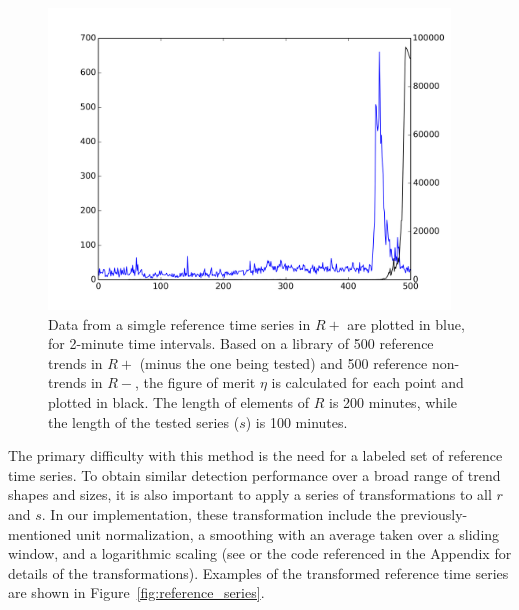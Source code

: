 \documentclass{article}
\begin{document}
\begin{figure}
\begin{center}
\includegraphics[width=0.95\textwidth]{fig/nikolov.png} 
\caption{Data from a simgle reference time series in $R+$ are plotted in blue, for
2-minute time intervals. Based on a library of 500 reference trends in $R+$
(minus the one being tested) and 500 reference non-trends in $R-$, the figure of
merit $\eta$ is calculated for each point and plotted in black. The length of
elements of $R$ is 200 minutes, while the length of the tested series ($s$) is 100
minutes. 
}
\label{fig:nikolov_eta} 
\end{center}
\end{figure}

The primary difficulty with this method is the need for a labeled set of reference time
series. To obtain similar detection performance over a broad range of trend shapes and sizes, 
it is also important to apply a series of transformations to all $r$ and $s$.
In our implementation, these transformation include the previously-mentioned unit normalization, 
a smoothing with an average taken over a sliding window,
and a logarithmic scaling
(see \cite{Nikolov:2011} or the code referenced in the Appendix
for details of the transformations). 
Examples of the transformed reference time series are shown in Figure~\ref{fig:reference_series}.
\end{document}

